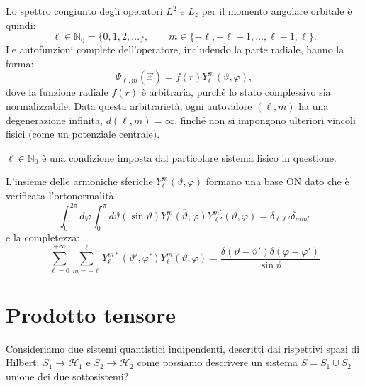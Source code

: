 Lo spettro congiunto degli operatori \(L^2\) e \(L_z\) per il momento angolare orbitale è quindi:
\begin{equation}
    \ell \in \mathbb{N}_0 = \{0, 1, 2, \dots\}, \qquad m \in \{-\ell, -\ell + 1, \dots, \ell - 1, \ell\}.
\end{equation}
Le autofunzioni complete dell'operatore, includendo la parte radiale, hanno la forma:
\[
    \Psi_{\ell,m}(\vec{x}) = f(r) Y_{\ell}^m(\vartheta, \varphi),
\]
dove la funzione radiale \(f(r)\) è arbitraria, purché lo stato complessivo sia normalizzabile.
Data questa arbitrarietà, ogni autovalore \((\ell, m)\) ha una degenerazione infinita, \(d(\ell, m) = \infty\), finché non si impongono ulteriori vincoli fisici (come un potenziale centrale).

\begin{attention}
    \(\ell \in \mathbb{N}_0\) è una condizione imposta dal particolare sistema fisico in questione.
\end{attention}
L'insieme delle armoniche sferiche \(Y_{\ell}^m(\vartheta, \varphi)\) formano una base ON dato che è verificata l'ortonormalità
\[
    \int_{0}^{2\pi} d\varphi \int_{0}^{\pi} d\vartheta (\sin\vartheta) \overline{Y_{\ell}^{m}(\vartheta, \varphi)} Y_{\ell'}^{m'}(\vartheta, \varphi) = \delta_{\ell\ell'} \delta_{mm'}
\]
e la completezza:
\[
    \sum_{\ell=0}^{+\infty} \sum_{m=-\ell}^{\ell} Y_{\ell}^{m*}(\vartheta', \varphi') Y_{\ell}^{m}(\vartheta, \varphi) = \frac{\delta(\vartheta - \vartheta')\delta(\varphi - \varphi')}{\sin\vartheta}
\]






\section{Prodotto tensore}

Consideriamo due sistemi quantistici indipendenti, descritti dai rispettivi spazi di Hilbert: \(S_1\to \mathcal{H}_1\) e \(S_2\to \mathcal{H}_2\)
come possiamo descrivere un sistema \(S = S_1 \cup S_2\) unione dei due sottosistemi?

